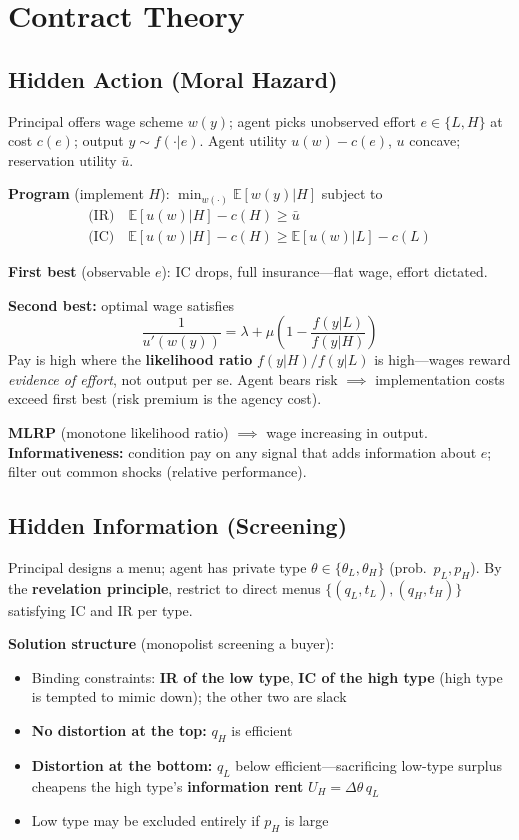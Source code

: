 \section{Contract Theory}

\subsection{Hidden Action (Moral Hazard)}
Principal offers wage scheme \(w(y)\); agent picks unobserved effort \(e \in \{L, H\}\) at cost \(c(e)\); output \(y \sim f(\cdot|e)\). Agent utility \(u(w) - c(e)\), \(u\) concave; reservation utility \(\bar u\).

\textbf{Program} (implement \(H\)): \(\min_{w(\cdot)} \mathbb{E}[w(y)|H]\) subject to
\begin{gather*}
\text{(IR)} \quad \mathbb{E}[u(w)|H] - c(H) \geq \bar u \\
\text{(IC)} \quad \mathbb{E}[u(w)|H] - c(H) \geq \mathbb{E}[u(w)|L] - c(L)
\end{gather*}

\textbf{First best} (observable \(e\)): IC drops, full insurance---flat wage, effort dictated.

\textbf{Second best:} optimal wage satisfies
\[\frac{1}{u'(w(y))} = \lambda + \mu\left(1 - \frac{f(y|L)}{f(y|H)}\right)\]
Pay is high where the \textbf{likelihood ratio} \(f(y|H)/f(y|L)\) is high---wages reward \textit{evidence of effort}, not output per se. Agent bears risk \(\implies\) implementation costs exceed first best (risk premium is the agency cost).

\textbf{MLRP} (monotone likelihood ratio) \(\implies\) wage increasing in output. \textbf{Informativeness:} condition pay on any signal that adds information about \(e\); filter out common shocks (relative performance).

\subsection{Hidden Information (Screening)}
Principal designs a menu; agent has private type \(\theta \in \{\theta_L, \theta_H\}\) (prob.\ \(p_L, p_H\)). By the \textbf{revelation principle}, restrict to direct menus \(\{(q_L, t_L), (q_H, t_H)\}\) satisfying IC and IR per type.

\textbf{Solution structure} (monopolist screening a buyer):
\begin{itemize}[nosep]
    \item Binding constraints: \textbf{IR of the low type}, \textbf{IC of the high type} (high type is tempted to mimic down); the other two are slack
    \item \textbf{No distortion at the top:} \(q_H\) is efficient
    \item \textbf{Distortion at the bottom:} \(q_L\) below efficient---sacrificing low-type surplus cheapens the high type's \textbf{information rent} \(U_H = \Delta\theta\, q_L\)
    \item Low type may be excluded entirely if \(p_H\) is large
\end{itemize}


